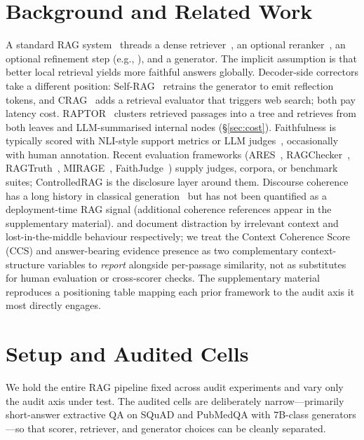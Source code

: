 \section{Background and Related Work}
\label{sec:bg}

A standard RAG system~\citep{lewis2020rag,gao2024ragsurvey} threads a
dense retriever~\citep{karpukhin2020dpr,xiong2024embedder}, an optional
reranker~\citep{nogueira2019passage}, an optional refinement step
(e.g., \citet{xu2024recomp}), and a generator. The implicit assumption
is that better local retrieval yields more faithful answers globally.
Decoder-side correctors take a different position:
Self-RAG~\citep{asai2024selfrag} retrains the generator to emit
reflection tokens, and CRAG~\citep{yan2024crag} adds a retrieval
evaluator that triggers web search; both pay latency cost.
RAPTOR~\citep{raptor2024} clusters retrieved passages into a tree and
retrieves from both leaves and LLM-summarised internal nodes
(\S\ref{sec:cost}). Faithfulness is typically scored with NLI-style
support metrics or LLM
judges~\citep{honovich2022true,laban2022summac,es2024ragas},
occasionally with human annotation. Recent evaluation frameworks
(ARES~\citep{saadfalcon2024ares}, RAGChecker~\citep{ru2024ragchecker},
RAGTruth~\citep{niu2024ragtruth}, MIRAGE~\citep{park2025mirage},
FaithJudge~\citep{tamber2025faithjudge}) supply judges, corpora, or
benchmark suites; ControlledRAG is the disclosure layer around them.
Discourse coherence has a long history in classical
generation~\citep{li2014coherence} but has not been quantified as a
deployment-time RAG signal (additional coherence references appear in
the supplementary material).
\citet{shi2023large} and \citet{liu2024lostmiddle} document
distraction by irrelevant context and lost-in-the-middle behaviour
respectively; we treat the Context Coherence Score (CCS) and
answer-bearing evidence presence as two complementary
context-structure variables to \emph{report} alongside per-passage
similarity, not as substitutes for human evaluation or cross-scorer
checks. The supplementary material reproduces a positioning table mapping each
prior framework to the audit axis it most directly engages.

\section{Setup and Audited Cells}
\label{sec:setup}

We hold the entire RAG pipeline fixed across audit experiments and vary
only the audit axis under test. The audited cells are deliberately
narrow---primarily short-answer extractive QA on SQuAD and PubMedQA
with $7$B-class generators---so that scorer, retriever, and generator
choices can be cleanly separated.

